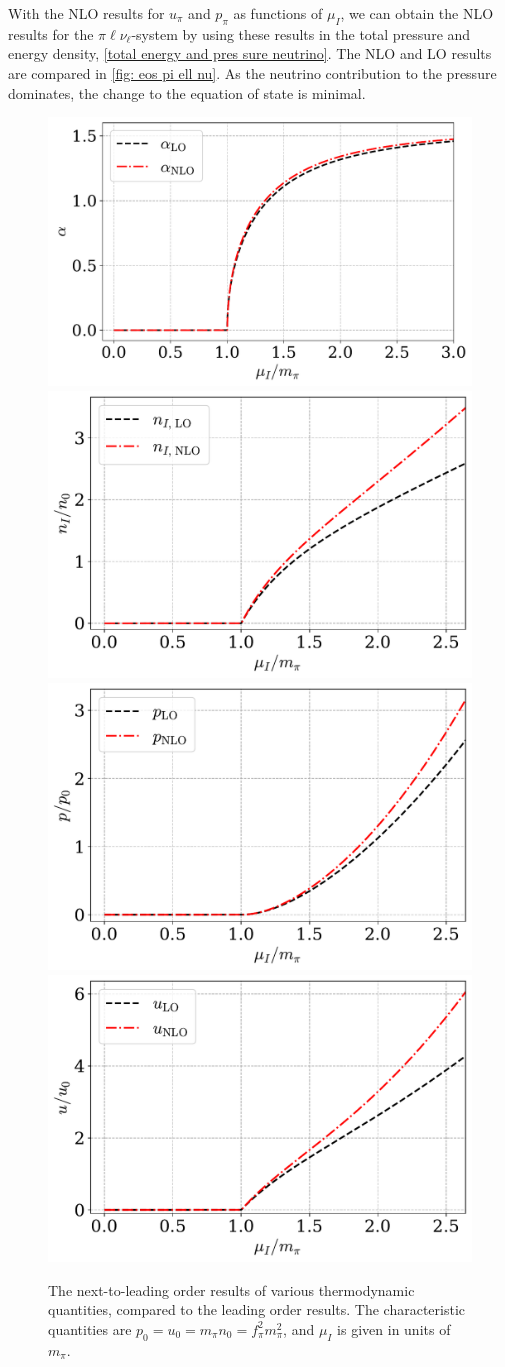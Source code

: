 With the NLO results for $u_\pi$ and $p_\pi$ as functions of $\mu_I$, we can obtain the NLO results for the $\pi\ell\nu_\ell$-system by using these results in the total pressure and energy density, \autoref{total energy and pres sure neutrino}.
The NLO and LO results are compared in \autoref{fig: eos pi ell nu}.
As the neutrino contribution to the pressure dominates, the change to the equation of state is minimal.

\begin{figure}[!htb]
    \centering
    \includegraphics[width=.51\textwidth]{../scripts/figurer/pion_nlo_alpha.pdf}
    \includegraphics[width=.48\textwidth]{../scripts/figurer/pion_nlo_nI_945.pdf}
    \includegraphics[width=.49\textwidth]{../scripts/figurer/pion_nlo_p_945.pdf}
    \includegraphics[width=.49\textwidth]{../scripts/figurer/pion_nlo_u_945.pdf}
    \caption{The next-to-leading order results of various thermodynamic quantities, compared to the leading order results. The characteristic quantities are $p_0 = u_0 = m_\pi n_0 = f_\pi^2 m_\pi^2$, and $\mu_I$ is given in units of $m_\pi$.}
    \label{fig: nlo quantitites}
\end{figure}


